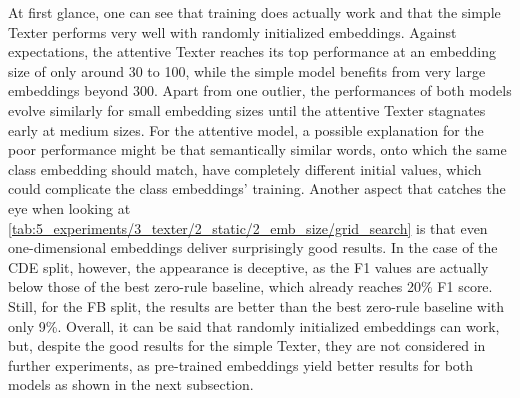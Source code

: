 At first glance, one can see that training does actually work and that the simple Texter performs very well with randomly initialized embeddings. Against expectations, the attentive Texter reaches its top performance at an embedding size of only around 30 to 100, while the simple model benefits from very large embeddings beyond 300. Apart from one outlier, the performances of both models evolve similarly for small embedding sizes until the attentive Texter stagnates early at medium sizes. For the attentive model, a possible explanation for the poor performance might be that semantically similar words, onto which the same class embedding should match, have completely different initial values, which could complicate the class embeddings' training. Another aspect that catches the eye when looking at \autoref{tab:5_experiments/3_texter/2_static/2_emb_size/grid_search} is that even one-dimensional embeddings deliver surprisingly good results. In the case of the CDE split, however, the appearance is deceptive, as the F1 values are actually below those of the best zero-rule baseline, which already reaches 20\% F1 score. Still, for the FB split, the results are better than the best zero-rule baseline with only 9\%. Overall, it can be said that randomly initialized embeddings can work, but, despite the good results for the simple Texter, they are not considered in further experiments, as pre-trained embeddings yield better results for both models as shown in the next subsection.
